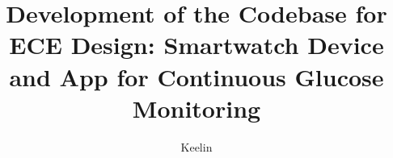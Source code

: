 \documentclass[defaultstyle,11pt]{thesis}
\title{Development of the Codebase for ECE Design: Smartwatch Device and App for Continuous Glucose Monitoring}
\author{Keelin}{Becker-Wheeler}
\begin{document}





\nocite{*}      %

\appendix

% 
\end{document}
